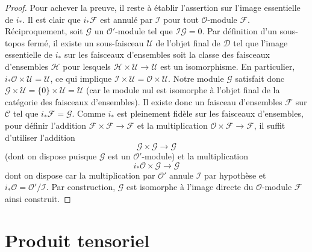 \begin{proof}
\medskip\noindent
Pour achever la preuve, il reste à établir l'assertion sur l'image
essentielle de $i_*$. Il est clair que $i_*\mathcal{F}$ est annulé par
$\mathcal{I}$ pour tout $\mathcal{O}$-module $\mathcal{F}$. Réciproquement,
soit $\mathcal{G}$ un $\mathcal{O}'$-module tel que
$\mathcal{I}\mathcal{G} = 0$. Par définition d'un sous-topos fermé, il existe
un sous-faisceau $\mathcal{U}$ de l'objet final de $\mathcal{D}$ tel que
l'image essentielle de $i_*$ sur les faisceaux d'ensembles soit la classe des
faisceaux d'ensembles $\mathcal{H}$ pour lesquels
$\mathcal{H} \times \mathcal{U} \to \mathcal{U}$ est un isomorphisme.
En particulier, $i_*\mathcal{O} \times \mathcal{U} = \mathcal{U}$, ce qui
implique $\mathcal{I} \times \mathcal{U} = \mathcal{O} \times \mathcal{U}$.
Notre module $\mathcal{G}$ satisfait donc
$\mathcal{G} \times \mathcal{U} = \{0\} \times \mathcal{U} = \mathcal{U}$
(car le module nul est isomorphe à l'objet final de la catégorie des
faisceaux d'ensembles). Il existe donc un faisceau d'ensembles $\mathcal{F}$
sur $\mathcal{C}$ tel que $i_*\mathcal{F} = \mathcal{G}$. Comme $i_*$ est
pleinement fidèle sur les faisceaux d'ensembles, pour définir l'addition
$\mathcal{F} \times \mathcal{F} \to \mathcal{F}$ et la multiplication
$\mathcal{O} \times \mathcal{F} \to \mathcal{F}$, il suffit d'utiliser
l'addition
$$
\mathcal{G} \times \mathcal{G} \longrightarrow \mathcal{G}
$$
(dont on dispose puisque $\mathcal{G}$ est un $\mathcal{O}'$-module) et la
multiplication
$$
i_*\mathcal{O} \times \mathcal{G} \to \mathcal{G}
$$
dont on dispose car la multiplication par $\mathcal{O}'$ annule
$\mathcal{I}$ par hypothèse et
$i_*\mathcal{O} = \mathcal{O}'/\mathcal{I}$. Par construction,
$\mathcal{G}$ est isomorphe à l'image directe du $\mathcal{O}$-module
$\mathcal{F}$ ainsi construit.
\end{proof}












\section{Produit tensoriel}
\label{section-tensor-product}

